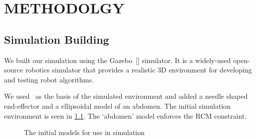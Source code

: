 \documentclass[BTech]{iitmdiss}
\begin{document}
    \chapter{METHODOLGY}\label{ch:method}


    \section{Simulation Building}

    We built our simulation using the Gazebo~[\cite{gazebo-url}] simulator.
    It is a widely-used open-source robotics simulator that provides a realistic 3D environment for developing and testing robot algorithms.

    We used~\cite{hennersperger2017towards} as the basis of the simulated environment and added a needle shaped end-effector and a ellipsoidal model of an abdomen.
    The initial simulation environment is seen in \ref{fig:initial_simulation_models}.
    The `abdomen' model enforces the RCM constraint.

    \begin{figure}
        \centering
        \qquad
        \qquad
        \caption{The initial models for use in simulation}
        \label{fig:initial_simulation_models}
    \end{figure}
\end{document}

